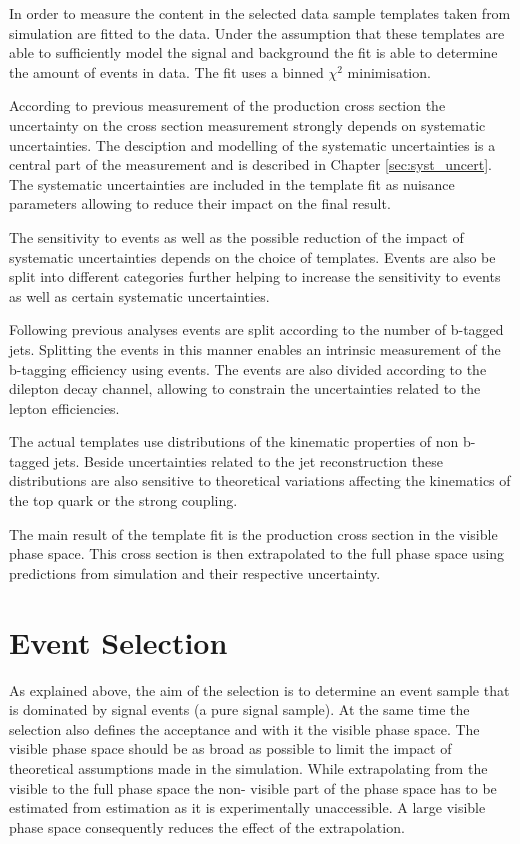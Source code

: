 In order to measure the \ttbar content in the selected data sample templates taken from simulation are fitted to the data. Under the assumption that these templates are able to sufficiently 
model the signal and background the fit is able to determine the amount of \ttbar events in data.
The fit uses a binned $\chi^2$ minimisation.

According to previous measurement of the \ttbar production cross section \cite{Khachatryan:2016kzg} the uncertainty on the cross section measurement strongly depends on systematic uncertainties. The desciption and modelling of the systematic uncertainties is a central part of the measurement and is described in Chapter \ref{sec:syst_uncert}. 
The systematic uncertainties are included in the template fit as nuisance parameters allowing to reduce their impact on the final result.

The sensitivity to \ttbar events as well as the possible reduction of the impact of systematic uncertainties depends on the choice of templates.
Events are also be split into different categories further helping to increase the sensitivity to \ttbar events as well as certain systematic uncertainties.

Following previous analyses \cite{Khachatryan:2016mqs} events are split according to the number of b-tagged jets. Splitting the events in this manner enables an intrinsic measurement of the b-tagging efficiency using \ttbar events.
The events are also divided according to the dilepton decay channel, allowing to constrain the uncertainties related to the lepton efficiencies.

The actual templates use distributions of the kinematic properties of non b-tagged jets. Beside uncertainties related to the jet reconstruction these distributions are also sensitive to theoretical variations affecting the kinematics of the top quark or the strong coupling.

The main result of the template fit is the \ttbar production cross section in the visible phase space. This cross section is then extrapolated to the full phase space using predictions from simulation and their
respective uncertainty.

\section{Event Selection}
\label{sec:xsec_sel}

As explained above, the aim of the selection is to determine an event sample that is dominated by signal events (a pure signal sample). At the same time the selection also defines the acceptance and with it the visible phase space. The visible phase space should be as broad as possible to limit the impact of theoretical assumptions made in the simulation. While extrapolating from the visible to the full phase space the non-
visible part of the phase space has to be estimated from estimation as it is experimentally unaccessible. A large visible phase space consequently reduces the effect of the extrapolation.

